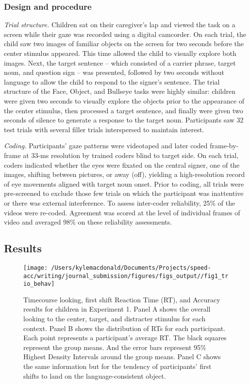 \documentclass[,man,floatsintext]{apa6}
\begin{document}
\hypertarget{design-and-procedure}{%
\subsubsection{Design and procedure}\label{design-and-procedure}}

\emph{Trial structure.} Children sat on their caregiver's lap and viewed the task on a screen while their gaze was recorded using a digital camcorder. On each trial, the child saw two images of familiar objects on the screen for two seconds before the center stimulus appeared. This time allowed the child to visually explore both images. Next, the target sentence -- which consisted of a carrier phrase, target noun, and question sign -- was presented, followed by two seconds without language to allow the child to respond to the signer's sentence. The trial structure of the Face, Object, and Bullseye tasks were highly similar: children were given two seconds to visually explore the objects prior to the appearance of the center stimulus, then processed a target sentence, and finally were given two seconds of silence to generate a response to the target noun. Participants saw 32 test trials with several filler trials interspersed to maintain interest.

\emph{Coding.} Participants' gaze patterns were videotaped and later coded frame-by-frame at 33-ms resolution by trained coders blind to target side. On each trial, coders indicated whether the eyes were fixated on the central signer, one of the images, shifting between pictures, or away (off), yielding a high-resolution record of eye movements aligned with target noun onset. Prior to coding, all trials were pre-screened to exclude those few trials on which the participant was inattentive or there was external interference. To assess inter-coder reliability, 25\% of the videos were re-coded. Agreement was scored at the level of individual frames of video and averaged 98\% on these reliability assessments.

\hypertarget{results}{%
\subsection{Results}\label{results}}

\begin{figure}[!t]

{\centering \texttt{[image: /Users/kylemacdonald/Documents/Projects/speed-acc/writing/journal\_submission/figures/figs\_output//fig1\_trio\_behav]} 

}

\caption{Timecourse looking, first shift Reaction Time (RT), and Accuracy results for children in Experiment 1. Panel A shows the overall looking to the center, target, and distracter stimulus for each context. Panel B shows the distribution of RTs for each participant. Each point represents a participant's average RT. The black squares represent the group means. And the error bars represent 95\% Highest Density Intervals around the group means. Panel C shows the same information but for the tendency of participants' first shifts to land on the language-consistent object.}\label{fig:speed-acc-trio-plot}
\end{figure}
\end{document}
